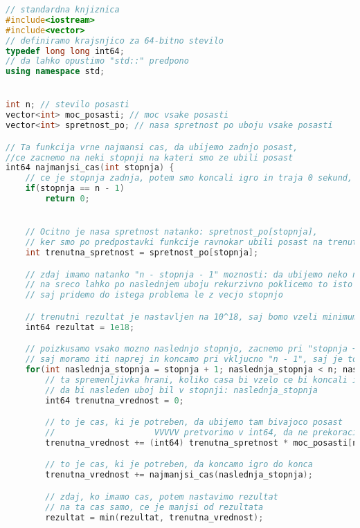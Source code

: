 \begin{lstlisting}[label={lst:code2}, language=C++]
// standardna knjiznica
#include<iostream>
#include<vector>
// definiramo krajsnjico za 64-bitno stevilo
typedef long long int64;
// da lahko opustimo "std::" predpono
using namespace std;


int n; // stevilo posasti
vector<int> moc_posasti; // moc vsake posasti
vector<int> spretnost_po; // nasa spretnost po uboju vsake posasti

// Ta funkcija vrne najmansi cas, da ubijemo zadnjo posast,
//ce zacnemo na neki stopnji na kateri smo ze ubili posast
int64 najmanjsi_cas(int stopnja) {
    // ce je stopnja zadnja, potem smo koncali igro in traja 0 sekund, da jo koncamo (d-uh)
    if(stopnja == n - 1)
        return 0;


    // Ocitno je nasa spretnost natanko: spretnost_po[stopnja],
    // ker smo po predpostavki funkcije ravnokar ubili posast na trenutni stopnji.
    int trenutna_spretnost = spretnost_po[stopnja];

    // zdaj imamo natanko "n - stopnja - 1" moznosti: da ubijemo neko naslednjo posast.
    // na sreco lahko po naslednjem uboju rekurzivno poklicemo to isto funkcijo,
    // saj pridemo do istega problema le z vecjo stopnjo

    // trenutni rezultat je nastavljen na 10^18, saj bomo vzeli minimum od vseh "n - stopnja - 1" izbir.
    int64 rezultat = 1e18;

    // poizkusamo vsako mozno naslednjo stopnjo, zacnemo pri "stopnja + 1",
    // saj moramo iti naprej in koncamo pri vkljucno "n - 1", saj je to zadnja stopnja.
    for(int naslednja_stopnja = stopnja + 1; naslednja_stopnja < n; naslednja_stopnja++) {
        // ta spremenljivka hrani, koliko casa bi vzelo ce bi koncali igro tako,
        // da bi nasleden uboj bil v stopnji: naslednja_stopnja
        int64 trenutna_vrednost = 0;

        // to je cas, ki je potreben, da ubijemo tam bivajoco posast
        //                    VVVVV pretvorimo v int64, da ne prekoraci omejitev 32 bitnih spremenljivk
        trenutna_vrednost += (int64) trenutna_spretnost * moc_posasti[naslednja_stopnja];

        // to je cas, ki je potreben, da koncamo igro do konca
        trenutna_vrednost += najmanjsi_cas(naslednja_stopnja);

        // zdaj, ko imamo cas, potem nastavimo rezultat
        // na ta cas samo, ce je manjsi od rezultata
        rezultat = min(rezultat, trenutna_vrednost);


\end{lstlisting}
